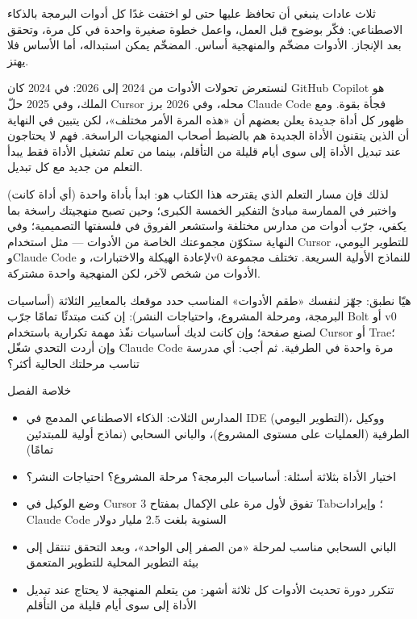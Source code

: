 
ثلاث عادات ينبغي أن تحافظ عليها حتى لو اختفت غدًا كل أدوات البرمجة بالذكاء الاصطناعي: فكّر بوضوح قبل العمل، واعمل خطوة صغيرة واحدة في كل مرة، وتحقق بعد الإنجاز. الأدوات مضخّم والمنهجية أساس. المضخّم يمكن استبداله، أما الأساس فلا يهتز.

لنستعرض تحولات الأدوات من 2024 إلى 2026: في 2024 كان GitHub Copilot هو الملك، وفي 2025 حلّ Cursor محله، وفي 2026 برز Claude Code فجأة بقوة. ومع ظهور كل أداة جديدة يعلن بعضهم أن «هذه المرة الأمر مختلف»، لكن يتبين في النهاية أن الذين يتقنون الأداة الجديدة هم بالضبط أصحاب المنهجيات الراسخة. فهم لا يحتاجون عند تبديل الأداة إلى سوى أيام قليلة من التأقلم، بينما من تعلم تشغيل الأداة فقط يبدأ التعلم من جديد مع كل تبديل.

لذلك فإن مسار التعلم الذي يقترحه هذا الكتاب هو: ابدأ بأداة واحدة (أي أداة كانت) واختبر في الممارسة مبادئ التفكير الخمسة الكبرى؛ وحين تصبح منهجيتك راسخة بما يكفي، جرّب أدوات من مدارس مختلفة واستشعر الفروق في فلسفتها التصميمية؛ وفي النهاية ستكوّن مجموعتك الخاصة من الأدوات — مثل استخدام Cursor للتطوير اليومي، وClaude Code لإعادة الهيكلة والاختبارات، وv0 للنماذج الأولية السريعة. تختلف مجموعة الأدوات من شخص لآخر، لكن المنهجية واحدة مشتركة.

\begin{tcbpractice}{هيّا نطبق: جهّز لنفسك «طقم الأدوات» المناسب}
حدد موقعك بالمعايير الثلاثة (أساسيات البرمجة، ومرحلة المشروع، واحتياجات النشر): إن كنت مبتدئًا تمامًا جرّب Bolt أو v0 لصنع صفحة؛ وإن كانت لديك أساسيات نفّذ مهمة تكرارية باستخدام Cursor أو Trae؛ وإن أردت التحدي شغّل Claude Code مرة واحدة في الطرفية. ثم أجب: أي مدرسة تناسب مرحلتك الحالية أكثر؟

\end{tcbpractice}

\begin{tcbsummary}{خلاصة الفصل}
\begin{itemize}
  \item المدارس الثلاث: الذكاء الاصطناعي المدمج في IDE (التطوير اليومي)، ووكيل الطرفية (العمليات على مستوى المشروع)، والباني السحابي (نماذج أولية للمبتدئين تمامًا)
  \item اختيار الأداة بثلاثة أسئلة: أساسيات البرمجة؟ مرحلة المشروع؟ احتياجات النشر؟
  \item وضع الوكيل في Cursor 3 تفوق لأول مرة على الإكمال بمفتاح Tab؛ وإيرادات Claude Code السنوية بلغت 2.5 مليار دولار
  \item الباني السحابي مناسب لمرحلة «من الصفر إلى الواحد»، وبعد التحقق تنتقل إلى بيئة التطوير المحلية للتطوير المتعمق
  \item تتكرر دورة تحديث الأدوات كل ثلاثة أشهر: من يتعلم المنهجية لا يحتاج عند تبديل الأداة إلى سوى أيام قليلة من التأقلم
\end{itemize}

\end{tcbsummary}
